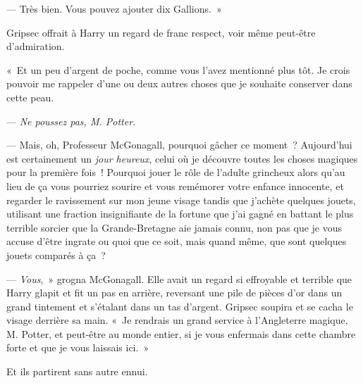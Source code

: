 --- Très bien. Vous pouvez ajouter dix Gallions.~»

Gripsec offrait à Harry un regard de franc respect, voir même peut-être d'admiration.

«~Et un peu d'argent de poche, comme vous l'avez mentionné plus tôt. Je crois pouvoir me rappeler d'une ou deux autres choses que je souhaite conserver dans cette peau.

--- \emph{Ne poussez pas, M. Potter.}

--- Mais, oh, Professeur McGonagall, pourquoi gâcher ce moment~? Aujourd'hui est certainement un \emph{jour heureux}, celui où je découvre toutes les choses magiques pour la première fois~! Pourquoi jouer le rôle de l'adulte grincheux alors qu'au lieu de ça vous pourriez sourire et vous remémorer votre enfance innocente, et regarder le ravissement sur mon jeune visage tandis que j'achète quelques jouets, utilisant une fraction insignifiante de la fortune que j'ai gagné en battant le plus terrible sorcier que la Grande-Bretagne aie jamais connu, non pas que je vous accuse d'être ingrate ou quoi que ce soit, mais quand même, que sont quelques jouets comparés à ça~?

--- \emph{Vous},~» grogna McGonagall. Elle avait un regard si effroyable et terrible que Harry glapit et fit un pas en arrière, reversant une pile de pièces d'or dans un grand tintement et s'étalant dans un tas d'argent. Gripsec soupira et se cacha le visage derrière sa main. «~Je rendrais un grand service à l'Angleterre magique, M. Potter, et peut-être au monde entier, si je vous enfermais dans cette chambre forte et que je vous laissais ici.~»

Et ils partirent sans autre ennui.

